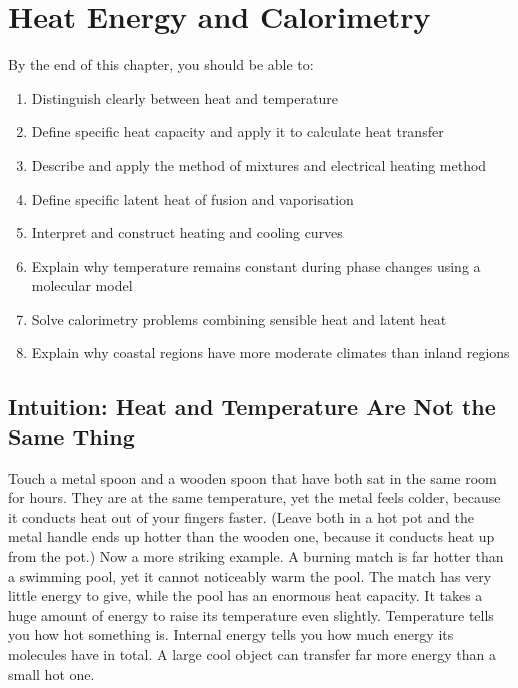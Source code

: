 %

\chapter{Heat Energy and Calorimetry}
\label{ch:calorimetry}
\minitoc
\newpage


\begin{objectivebox}
By the end of this chapter, you should be able to:
\begin{enumerate}[noitemsep]
  \item Distinguish clearly between heat and
  temperature
  \item Define specific heat capacity and apply it
  to calculate heat transfer
  \item Describe and apply the method of mixtures
  and electrical heating method
  \item Define specific latent heat of fusion and
  vaporisation
  \item Interpret and construct heating and cooling
  curves
  \item Explain why temperature remains constant
  during phase changes using a molecular model
  \item Solve calorimetry problems combining
  sensible heat and latent heat
  \item Explain why coastal regions have more
  moderate climates than inland regions
\end{enumerate}
\end{objectivebox}

\section{Intuition: Heat and Temperature Are Not the
Same Thing}

Touch a metal spoon and a wooden spoon that have both sat in the
same room for hours. They are at the same temperature, yet the metal
feels colder, because it conducts heat out of your fingers faster.
(Leave both in a hot pot and the metal handle ends up hotter than the
wooden one, because it conducts heat up from the pot.) Now a more
striking example. A burning match is far hotter than a swimming pool,
yet it cannot noticeably warm the pool. The match has very little
energy to give, while the pool has an enormous heat capacity. It takes
a huge amount of energy to raise its temperature even slightly.
Temperature tells you how hot something is. Internal energy tells
you how much energy its molecules have in total. A large cool object
can transfer far more energy than a small hot one.

